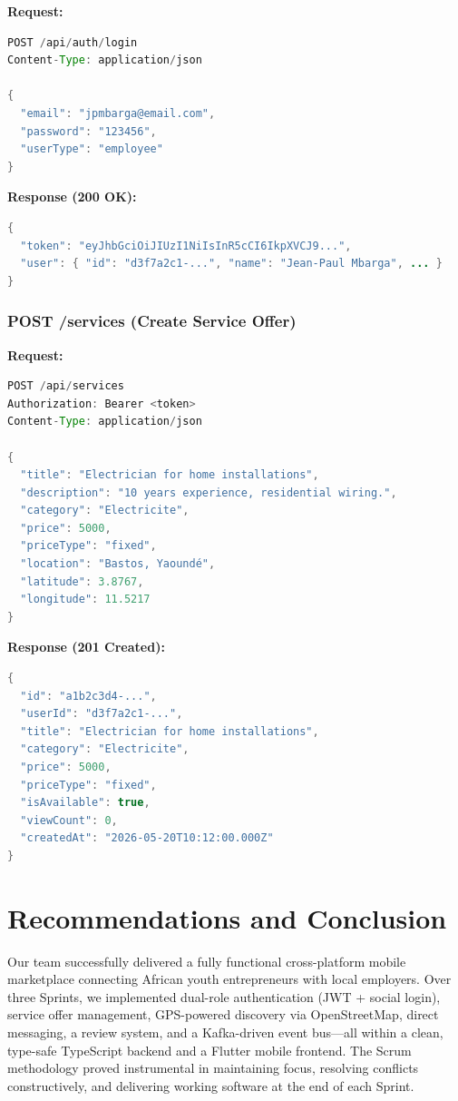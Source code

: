 \documentclass[12pt,a4paper]{report}
\begin{document}
\textbf{Request:}
\begin{lstlisting}[language=Java]
POST /api/auth/login
Content-Type: application/json

{
  "email": "jpmbarga@email.com",
  "password": "123456",
  "userType": "employee"
}
\end{lstlisting}

\textbf{Response (200 OK):}
\begin{lstlisting}[language=Java]
{
  "token": "eyJhbGciOiJIUzI1NiIsInR5cCI6IkpXVCJ9...",
  "user": { "id": "d3f7a2c1-...", "name": "Jean-Paul Mbarga", ... }
}
\end{lstlisting}

\subsection{POST /services (Create Service Offer)}

\textbf{Request:}
\begin{lstlisting}[language=Java]
POST /api/services
Authorization: Bearer <token>
Content-Type: application/json

{
  "title": "Electrician for home installations",
  "description": "10 years experience, residential wiring.",
  "category": "Electricite",
  "price": 5000,
  "priceType": "fixed",
  "location": "Bastos, Yaoundé",
  "latitude": 3.8767,
  "longitude": 11.5217
}
\end{lstlisting}

\textbf{Response (201 Created):}
\begin{lstlisting}[language=Java]
{
  "id": "a1b2c3d4-...",
  "userId": "d3f7a2c1-...",
  "title": "Electrician for home installations",
  "category": "Electricite",
  "price": 5000,
  "priceType": "fixed",
  "isAvailable": true,
  "viewCount": 0,
  "createdAt": "2026-05-20T10:12:00.000Z"
}
\end{lstlisting}

\chapter{Recommendations and Conclusion}

Our team successfully delivered a fully functional cross-platform mobile marketplace connecting African youth entrepreneurs with local employers. Over three Sprints, we implemented dual-role authentication (JWT + social login), service offer management, GPS-powered discovery via OpenStreetMap, direct messaging, a review system, and a Kafka-driven event bus—all within a clean, type-safe TypeScript backend and a Flutter mobile frontend. The Scrum methodology proved instrumental in maintaining focus, resolving conflicts constructively, and delivering working software at the end of each Sprint.
\end{document}
